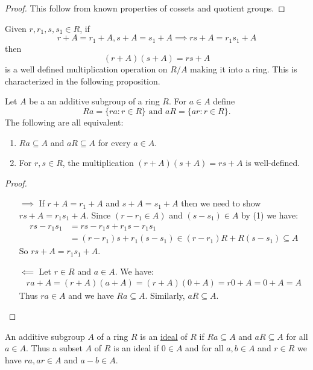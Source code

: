 \documentclass[11pt]{article}
\begin{document}
\begin{proof}
    This follow from known properties of cossets and quotient groups.
\end{proof}

\begin{remark}
    Given $r,r_1,s,s_1\in R$, if
    \[r+A=r_1+A,s+A=s_1+A\implies rs+A=r_1s_1+A\]
    then
    \[(r+A)(s+A)=rs+A\]
    is a well defined multiplication operation on $R/A$ making it into a ring. This is characterized in the following proposition.
\end{remark}

\begin{proposition}
    Let $A$ be a an additive subgroup of a ring $R$. For $a\in A$ define
    \[Ra=\{ra:r\in R\}\text{ and }aR=\{ar:r\in R\}.\]
    The following are all equivalent:
    \begin{enumerate}
        \item $Ra\subseteq A$ and $aR\subseteq A$ for every $a\in A$.
        \item For $r,s\in R$, the multiplication $(r+A)(s+A)=rs+A$ is well-defined.
    \end{enumerate}
\end{proposition}

\begin{proof}\,
    \begin{itemize}
        \item[$\implies$] If $r+A=r_1+A$ and $s+A=s_1+A$ then we need to show $rs+A=r_1s_1+A$. Since $(r-r_1\in A)$ and $(s-s_1)\in A$ by (1) we have:
        \begin{align*}
            rs-r_1s_1&=rs-r_1s+r_1s-r_1s_1 \\
            &=(r-r_1)s+r_1(s-s_1)\in(r-r_1)R+R(s-s_1)\subseteq A
        \end{align*}
        So $rs+A=r_1s_1+A$.
    
        \item[$\impliedby$] Let $r\in R$ and $a\in A$. We have:
        \begin{align*}
            ra+A=(r+A)(a+A)=(r+A)(0+A)=r0+A=0+A=A
        \end{align*}
        Thus $ra\in A$ and we have $Ra\subseteq A$. Similarly, $aR\subseteq A$.
    \end{itemize}
\end{proof}

\begin{definition}[Ideal]
    An additive subgroup $A$ of a ring $R$ is an \ul{ideal} of $R$ if $Ra\subseteq A$ and $aR\subseteq A$ for all $a\in A$. Thus a subset $A$ of $R$ is an ideal if $0\in A$ and for all $a,b\in A$ and $r\in R$ we have $ra,ar\in A$ and $a-b\in A$.
\end{definition}
\end{document}
